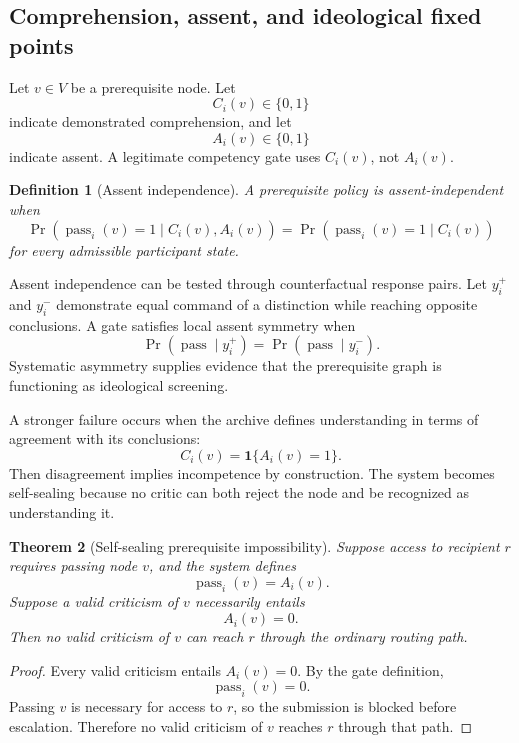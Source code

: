 \documentclass[11pt]{article}
\newtheorem{definition}{Definition}[section]
\newtheorem{theorem}[definition]{Theorem}
\theoremstyle{definition}
\DeclareMathOperator{\Prob}{Pr}
\newcommand{\ind}{\mathbf{1}}
\begin{document}
\subsection{Comprehension, assent, and ideological fixed points}

Let \(v\in V\) be a prerequisite node. Let
\[
C_i(v)\in\{0,1\}
\]
indicate demonstrated comprehension, and let
\[
A_i(v)\in\{0,1\}
\]
indicate assent. A legitimate competency gate uses \(C_i(v)\), not \(A_i(v)\).

\begin{definition}[Assent independence]
A prerequisite policy is assent-independent when
\[
\Prob(
\operatorname{pass}_i(v)=1
\mid
C_i(v),A_i(v)
)
=
\Prob(
\operatorname{pass}_i(v)=1
\mid
C_i(v)
)
\]
for every admissible participant state.
\end{definition}

Assent independence can be tested through counterfactual response pairs. Let \(y_i^{+}\) and \(y_i^{-}\) demonstrate equal command of a distinction while reaching opposite conclusions. A gate satisfies local assent symmetry when
\[
\Prob(\operatorname{pass}\mid y_i^{+})
=
\Prob(\operatorname{pass}\mid y_i^{-}).
\]
Systematic asymmetry supplies evidence that the prerequisite graph is functioning as ideological screening.

A stronger failure occurs when the archive defines understanding in terms of agreement with its conclusions:
\[
C_i(v)
=
\ind\{A_i(v)=1\}.
\]
Then disagreement implies incompetence by construction. The system becomes self-sealing because no critic can both reject the node and be recognized as understanding it.

\begin{theorem}[Self-sealing prerequisite impossibility]
Suppose access to recipient \(r\) requires passing node \(v\), and the system defines
\[
\operatorname{pass}_i(v)=A_i(v).
\]
Suppose a valid criticism of \(v\) necessarily entails
\[
A_i(v)=0.
\]
Then no valid criticism of \(v\) can reach \(r\) through the ordinary routing path.
\end{theorem}

\begin{proof}
Every valid criticism entails \(A_i(v)=0\). By the gate definition,
\[
\operatorname{pass}_i(v)=0.
\]
Passing \(v\) is necessary for access to \(r\), so the submission is blocked before escalation. Therefore no valid criticism of \(v\) reaches \(r\) through that path.
\end{proof}
\end{document}
